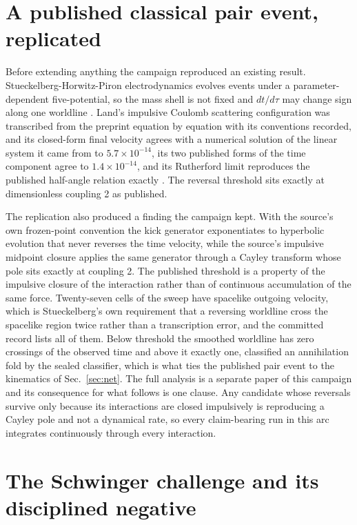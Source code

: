 \documentclass[aps,pre,reprint,nofootinbib,floatfix]{revtex4-2}
\begin{document}
\section{A published classical pair event, replicated}
\label{sec:pf3}

Before extending anything the campaign reproduced an existing result.
Stueckelberg-Horwitz-Piron electrodynamics evolves events under a
parameter-dependent five-potential, so the mass shell is not fixed and
$dt/d\tau$ may change sign along one worldline
\cite{Stueckelberg1941, HorwitzPiron1973, SaadHorwitzArshansky1989}.
Land's impulsive Coulomb scattering configuration was transcribed from
the preprint equation by equation with its
conventions recorded, and its closed-form final velocity agrees with a
numerical solution of the linear system it came from to
$5.7 \times 10^{-14}$, its two published forms of the time component
agree to $1.4 \times 10^{-14}$, and its Rutherford limit reproduces the
published half-angle relation exactly \cite{Land2016}.  The reversal
threshold sits exactly at dimensionless coupling 2 as published.

The replication also produced a finding the campaign kept.  With the
source's own frozen-point convention the kick generator exponentiates
to hyperbolic evolution that never reverses the time velocity, while
the source's impulsive midpoint closure applies the same generator
through a Cayley transform whose pole sits exactly at coupling 2.  The
published threshold is a property of the impulsive closure of the
interaction rather than of continuous accumulation of the same force.
Twenty-seven cells of the sweep have spacelike outgoing velocity, which
is Stueckelberg's own requirement that a reversing worldline cross the
spacelike region twice rather than a transcription error, and the
committed record lists all of them.  Below threshold the smoothed
worldline has zero crossings of the observed time and above it exactly
one, classified an annihilation fold by the sealed classifier, which is
what ties the published pair event to the kinematics of
Sec.~\ref{sec:net}.  The full analysis is a separate paper of this
campaign \cite{ZenodoCayley} and its consequence for what follows is
one clause.  Any candidate whose reversals survive only because its
interactions are closed impulsively is reproducing a Cayley pole and
not a dynamical rate, so every claim-bearing run in this arc integrates
continuously through every interaction.

\section{The Schwinger challenge and its disciplined negative}
\label{sec:pf4}
\end{document}
